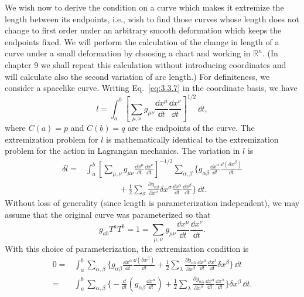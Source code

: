 We wish now to derive the condition on a curve which makes it extremize the
length between its endpoints, i.e., wish to find those curves whose length does not
change to first order under an arbitrary smooth deformation which keeps the endpoints fixed. We will perform the calculation of the change in length of a curve under
a small deformation by choosing a chart and working in $\mathbb R^n$. (In chapter 9 we shall
repeat this calculation without introducing coordinates and will calculate also the
second variation of arc length.) For definiteness, we consider a spacelike curve.
Writing Eq.~\eqref{eq:3.3.7} in the coordinate basis, we have
\begin{equation}
  l=\int_a^b\left[\sum_{\mu,\nu}g_{\mu\nu}
  \frac{\dd x^\mu}{\dd t}\frac{\dd x^\nu}{\dd t}\right]^{1/2}\,\dd t,
  \tag{3.3.10}\label{eq:3.3.10}
\end{equation}
where $C(a)=p$ and $C(b)=q$ are the endpoints of the curve. The extremization
problem for $l$ is mathematically identical to the extremization problem for the action
in Lagrangian mechanics. The variation in $l$ is
\begin{equation}
  \begin{aligned}
    \delta l={}&\int_a^b\left[\sum_{\mu,\nu}g_{\mu\nu}
    \frac{\dd x^\mu}{\dd t}\frac{\dd x^\nu}{\dd t}\right]^{-1/2}
    \sum_{\alpha,\beta}\biggl\{
    g_{\alpha\beta}\frac{\dd x^\alpha}{\dd t}\frac{\dd(\delta x^\beta)}{\dd t}\\
    &\qquad\qquad+\frac{1}{2}\sum_\sigma
    \frac{\partial g_{\alpha\beta}}{\partial x^\sigma}
    \delta x^\sigma\frac{\dd x^\alpha}{\dd t}\frac{\dd x^\beta}{\dd t}
    \biggr\}\,\dd t.
  \end{aligned}
  \tag{3.3.11}\label{eq:3.3.11}
\end{equation}
Without loss of generality (since length is parameterization independent), we may
assume that the original curve was parameterized so that
\begin{equation*}
  g_{ab}T^aT^b=1
  =\sum_{\mu,\nu}g_{\mu\nu}\frac{\dd x^\mu}{\dd t}\frac{\dd x^\nu}{\dd t}.
\end{equation*}
With this choice of parameterization, the extremization condition is
\begin{equation}
  \begin{aligned}
    0={}&\int_a^b\sum_{\alpha,\beta}\biggl\{
    g_{\alpha\beta}\frac{\dd x^\alpha}{\dd t}\frac{\dd(\delta x^\beta)}{\dd t}
    +\frac{1}{2}\sum_\lambda
    \frac{\partial g_{\alpha\lambda}}{\partial x^\beta}
    \frac{\dd x^\alpha}{\dd t}\frac{\dd x^\lambda}{\dd t}\delta x^\beta
    \biggr\}\,\dd t\\
    ={}&\int_a^b\sum_{\alpha,\beta}\biggl\{
    -\frac{\dd}{\dd t}\left(g_{\alpha\beta}\frac{\dd x^\alpha}{\dd t}\right)
    +\frac{1}{2}\sum_\lambda
    \frac{\partial g_{\alpha\lambda}}{\partial x^\beta}
    \frac{\dd x^\alpha}{\dd t}\frac{\dd x^\lambda}{\dd t}
    \biggr\}\delta x^\beta\,\dd t.
  \end{aligned}
  \tag{3.3.12}\label{eq:3.3.12}
\end{equation}
